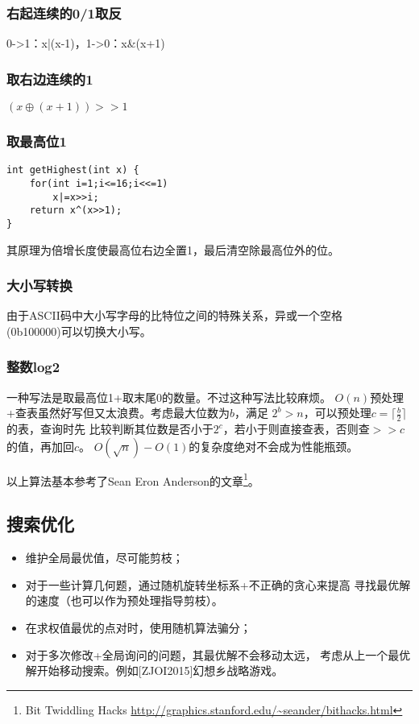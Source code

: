 \subsubsection{右起连续的0/1取反}
0->1：x|(x-1)，1->0：x\&(x+1)
\subsubsection{取右边连续的1}
$(x \oplus (x+1))>>1$
\subsubsection{取最高位1}
\begin{lstlisting}
int getHighest(int x) {
    for(int i=1;i<=16;i<<=1)
        x|=x>>i;
    return x^(x>>1);
}
\end{lstlisting}

其原理为倍增长度使最高位右边全置1，最后清空除最高位外的位。
\subsubsection{大小写转换}
由于ASCII码中大小写字母的比特位之间的特殊关系，异或一个空格\\(0b100000)可以切换大小写。

\subsubsection{整数log2}
一种写法是取最高位1+取末尾0的数量。不过这种写法比较麻烦。
$O(n)$预处理+查表虽然好写但又太浪费。考虑最大位数为$b$，满足
$2^b>n$，可以预处理$c=\lceil \frac{b}{2}\rceil$的表，查询时先
比较判断其位数是否小于$2^c$，若小于则直接查表，否则查$>>c$的值，再加回$c$。
$O(\sqrt{n})-O(1)$的复杂度绝对不会成为性能瓶颈。

以上算法基本参考了Sean Eron Anderson的文章\footnote{
    Bit Twiddling Hacks
    \url{http://graphics.stanford.edu/\~seander/bithacks.html}
}。
\subsection{搜索优化}
\begin{itemize}
    \item 维护全局最优值，尽可能剪枝；
    \item 对于一些计算几何题，通过随机旋转坐标系+不正确的贪心来提高
    寻找最优解的速度（也可以作为预处理指导剪枝）。
    \item 在求权值最优的点对时，使用随机算法骗分；
    \item 对于多次修改+全局询问的问题，其最优解不会移动太远，
    考虑从上一个最优解开始移动搜索。例如[ZJOI2015]幻想乡战略游戏。
\end{itemize}
